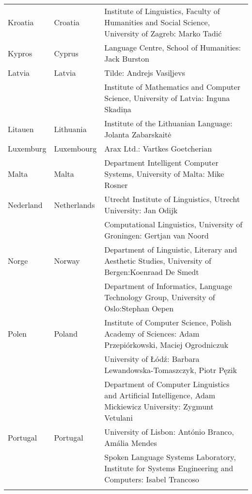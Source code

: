 \begin{longtable}{llp{114mm}}
  Kroatia & \textcolor{grey1}{Croatia} & Institute of Linguistics, Faculty of Humanities and Social Science, University of Zagreb: Marko Tadić \\ \addlinespace
  Kypros & \textcolor{grey1}{Cyprus} & Language Centre, School of
  Humanities: Jack Burston \\ \addlinespace
  Latvia & \textcolor{grey1}{Latvia} & Tilde: Andrejs Vasiļjevs\\ \addlinespace 
  & & Institute of Mathematics and Computer Science, University of Latvia: Inguna Skadiņa\\ \addlinespace
  Litauen & \textcolor{grey1}{Lithuania} & Institute of the Lithuanian Language: Jolanta Zabarskaitė\\ \addlinespace
  Luxemburg & \textcolor{grey1}{Luxembourg} & Arax Ltd.: Vartkes Goetcherian\\ \addlinespace
  Malta & \textcolor{grey1}{Malta} & Department Intelligent Computer Systems, University of Malta: Mike Rosner\\ \addlinespace
  Nederland & \textcolor{grey1}{Netherlands} & Utrecht Institute of Linguistics, Utrecht University: Jan Odijk\\ \addlinespace 
  & & Computational Linguistics, University of Groningen: Gertjan van Noord\\ \addlinespace 
  Norge & \textcolor{grey1}{Norway} & Department of Linguistic, Literary and Aesthetic Studies, University of Bergen:\newline Koenraad De Smedt\\ \addlinespace 
  & & Department of Informatics, Language Technology Group, University of Oslo:\newline Stephan Oepen \\ \addlinespace
  Polen & \textcolor{grey1}{Poland} & Institute of Computer Science, Polish Academy of Sciences: Adam Przepiórkowski, Maciej Ogrodniczuk \\ \addlinespace
  & & University of Łódź: Barbara Lewandowska-Tomaszczyk, Piotr Pęzik\\ \addlinespace 
  & & Department of Computer Linguistics and Artificial Intelligence, Adam Mickiewicz University: Zygmunt Vetulani\\ \addlinespace  
  Portugal & \textcolor{grey1}{Portugal} & University of Lisbon: António Branco, Amália Mendes \\ \addlinespace
  & & Spoken Language Systems Laboratory, Institute for Systems Engineering and Computers: Isabel Trancoso \\ \addlinespace

\end{longtable}
